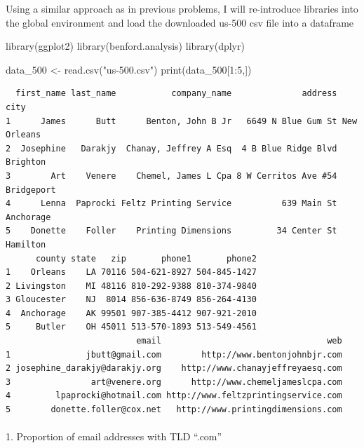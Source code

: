 \documentclass[
  12pt,
]{article}
\makeatletter
\let\oldparagraph\paragraph
\renewcommand{\paragraph}{
    \@ifstar
      \xxxParagraphStar
      \xxxParagraphNoStar
  }
\newcommand{\xxxParagraphStar}[1]{\oldparagraph*{#1}\mbox{}}
\newcommand{\xxxParagraphNoStar}[1]{\oldparagraph{#1}\mbox{}}
\newenvironment{Shaded}{\begin{snugshade}}{\end{snugshade}}
\newcommand{\DecValTok}[1]{\textcolor[rgb]{0.68,0.00,0.00}{#1}}
\newcommand{\FunctionTok}[1]{\textcolor[rgb]{0.28,0.35,0.67}{#1}}
\newcommand{\NormalTok}[1]{\textcolor[rgb]{0.00,0.23,0.31}{#1}}
\newcommand{\OtherTok}[1]{\textcolor[rgb]{0.00,0.23,0.31}{#1}}
\newcommand{\SpecialCharTok}[1]{\textcolor[rgb]{0.37,0.37,0.37}{#1}}
\newcommand{\StringTok}[1]{\textcolor[rgb]{0.13,0.47,0.30}{#1}}
\makeatother
\begin{document}
Using a similar approach as in previous problems, I will re-introduce
libraries into the global environment and load the downloaded us-500 csv
file into a dataframe

\begin{Shaded}
\begin{Highlighting}[]
\FunctionTok{library}\NormalTok{(ggplot2)      }
\FunctionTok{library}\NormalTok{(benford.analysis)}
\FunctionTok{library}\NormalTok{(dplyr)         }


\NormalTok{data\_500 }\OtherTok{\textless{}{-}} \FunctionTok{read.csv}\NormalTok{(}\StringTok{"us{-}500.csv"}\NormalTok{)}
\FunctionTok{print}\NormalTok{(data\_500[}\DecValTok{1}\SpecialCharTok{:}\DecValTok{5}\NormalTok{,])}
\end{Highlighting}
\end{Shaded}

\begin{verbatim}
  first_name last_name           company_name              address        city
1      James      Butt      Benton, John B Jr   6649 N Blue Gum St New Orleans
2  Josephine   Darakjy  Chanay, Jeffrey A Esq  4 B Blue Ridge Blvd    Brighton
3        Art    Venere    Chemel, James L Cpa 8 W Cerritos Ave #54  Bridgeport
4      Lenna  Paprocki Feltz Printing Service          639 Main St   Anchorage
5    Donette    Foller    Printing Dimensions         34 Center St    Hamilton
      county state   zip       phone1       phone2
1    Orleans    LA 70116 504-621-8927 504-845-1427
2 Livingston    MI 48116 810-292-9388 810-374-9840
3 Gloucester    NJ  8014 856-636-8749 856-264-4130
4  Anchorage    AK 99501 907-385-4412 907-921-2010
5     Butler    OH 45011 513-570-1893 513-549-4561
                          email                                 web
1               jbutt@gmail.com        http://www.bentonjohnbjr.com
2 josephine_darakjy@darakjy.org    http://www.chanayjeffreyaesq.com
3                art@venere.org      http://www.chemeljameslcpa.com
4         lpaprocki@hotmail.com http://www.feltzprintingservice.com
5        donette.foller@cox.net   http://www.printingdimensions.com
\end{verbatim}

\paragraph{1. Proportion of email addresses with TLD
``.com''}\label{proportion-of-email-addresses-with-tld-.com}
\end{document}
